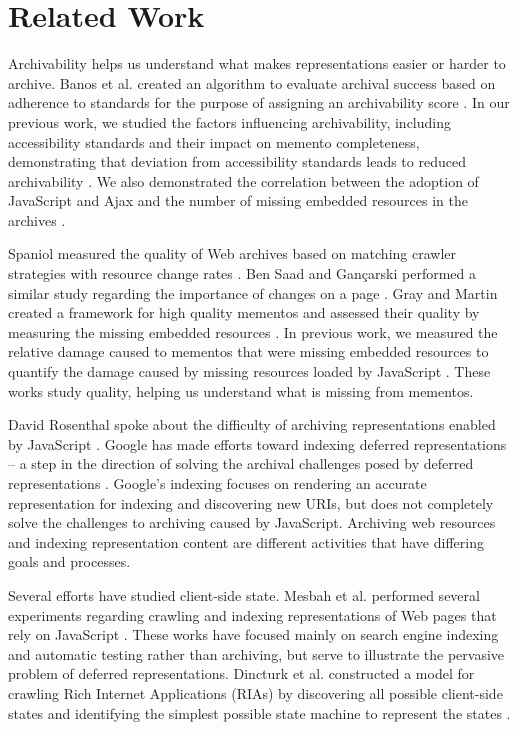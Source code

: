 \documentclass{ipres_proc_article-sp}
\begin{document}
\section{Related Work}
\label{priorwork}
Archivability helps us understand what makes representations easier or harder to archive. Banos et al. created an algorithm to evaluate archival success based on adherence to standards for the purpose of assigning an archivability score \cite{ipresArchivability}. In our previous work, we studied the factors influencing archivability, including accessibility standards and their impact on memento completeness, demonstrating that deviation from accessibility standards leads to reduced archivability \cite{kellyTPDL2013}. We also demonstrated the correlation between the adoption of JavaScript and Ajax and the number of missing embedded resources in the archives \cite{ijdl}. 

Spaniol measured the quality of Web archives based on matching crawler strategies with resource change rates \cite{spaniol9catch, spaniol2009data, Denev:2009:SFQ:1687627.1687694}. Ben Saad and Gan\c{c}arski performed a similar study regarding the importance of changes on a page \cite{saad2011}. Gray and Martin created a framework for high quality mementos and assessed their quality by measuring the missing embedded resources \cite{mementoQuality}. In previous work, we measured the relative damage caused to mementos that were missing embedded resources to quantify the damage caused by missing resources loaded by JavaScript \cite{brunelleDamage}. These works study quality, helping us understand what is missing from mementos.

David Rosenthal spoke about the difficulty of archiving representations enabled by JavaScript \cite{iipc2013, futureWeb}. Google has made efforts toward indexing deferred representations -- a step in the direction of solving the archival challenges posed by deferred representations \cite{googleJS}. Google's indexing focuses on rendering an accurate representation for indexing and discovering new URIs, but does not completely solve the challenges to archiving caused by JavaScript. Archiving web resources and indexing representation content are different activities that have differing goals and processes.

Several efforts have studied client-side state. Mesbah et al. performed several experiments regarding crawling and indexing representations of Web pages that rely on JavaScript \cite{mesbahCrawling, mesbahInferState}. These works have focused mainly on search engine indexing and automatic testing \cite{mesbahTesting, mesbah2} rather than archiving, but serve to illustrate the pervasive problem of deferred representations. Dincturk et al. constructed a model for crawling Rich Internet Applications (RIAs) by discovering all possible client-side states and identifying the simplest possible state machine to represent the states \cite{dincturkAjax}. 
\end{document}
